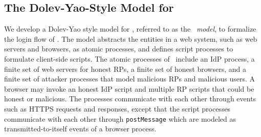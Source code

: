 


\subsection{The Dolev-Yao-Style Model for \usso}
\label{dy-model}

We develop a Dolev-Yao style model \cite{BrowserID, SPRESSO, FettKS16, FettKS17} for \usso, referred to as the \emph{\dyu\ model}, to formalize the login flow of \usso.
The model abstracts the entities in a web system, such as web servers and browsers, as atomic processes, %
and defines script processes to formulate client-side scripts.
The atomic processes of \usso\ include an IdP process, a finite set of web servers for honest RPs, a finite set of honest browsers, and a finite set of attacker processes that model malicious RPs and malicious users.
A browser may invoke an honest IdP script and multiple RP scripts that could be honest or malicious.
The processes communicate with each other through events such as HTTPS requests and responses,
except that the script processes communicate with each other through \verb+postMessage+ which are modeled as transmitted-to-itself events of a browser process.

